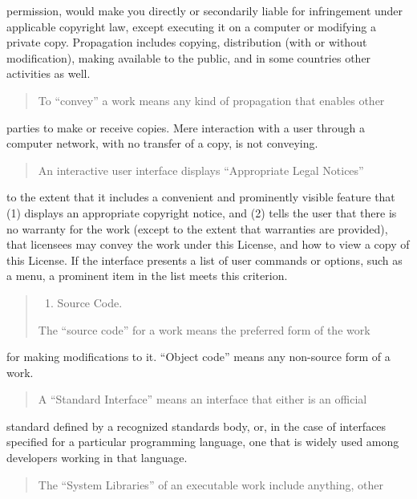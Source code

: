 \documentclass[letterpaper,10pt,english]{sphinxmanual}
\begin{document}
permission, would make you directly or secondarily liable for
infringement under applicable copyright law, except executing it on a
computer or modifying a private copy.  Propagation includes copying,
distribution (with or without modification), making available to the
public, and in some countries other activities as well.
\begin{quote}

To “convey” a work means any kind of propagation that enables other
\end{quote}

parties to make or receive copies.  Mere interaction with a user through
a computer network, with no transfer of a copy, is not conveying.
\begin{quote}

An interactive user interface displays “Appropriate Legal Notices”
\end{quote}

to the extent that it includes a convenient and prominently visible
feature that (1) displays an appropriate copyright notice, and (2)
tells the user that there is no warranty for the work (except to the
extent that warranties are provided), that licensees may convey the
work under this License, and how to view a copy of this License.  If
the interface presents a list of user commands or options, such as a
menu, a prominent item in the list meets this criterion.
\begin{quote}
\begin{enumerate}
\item {} 
Source Code.

\end{enumerate}

The “source code” for a work means the preferred form of the work
\end{quote}

for making modifications to it.  “Object code” means any non-source
form of a work.
\begin{quote}

A “Standard Interface” means an interface that either is an official
\end{quote}

standard defined by a recognized standards body, or, in the case of
interfaces specified for a particular programming language, one that
is widely used among developers working in that language.
\begin{quote}

The “System Libraries” of an executable work include anything, other
\end{quote}
\end{document}
